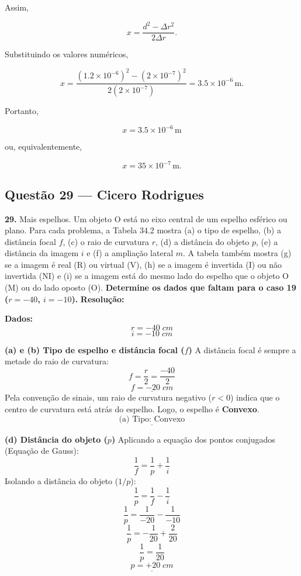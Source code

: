\documentclass[12pt,a4paper]{article}
\begin{document}
Assim,

\[
x=\frac{d^2-\Delta r^2}{2\Delta r}.
\]

Substituindo os valores numéricos,

\[
x=
\frac{(1.2\times10^{-6})^2-(2\times10^{-7})^2}
     {2(2\times10^{-7})}
=
3.5\times10^{-6}\,\text{m}.
\]

Portanto,

\[
\boxed{x=3.5\times10^{-6}\,\text{m}}
\]

ou, equivalentemente,

\[
\boxed{x=35\times10^{-7}\,\text{m}}.
\]

\subsection{Questão 29 — Cicero Rodrigues}

\textbf{29. }\normalfont Mais espelhos. Um objeto O está no eixo central de um espelho esférico ou plano. Para cada problema, a Tabela 34.2 mostra (a) o tipo de espelho, (b) a distância focal $f$, (c) o raio de curvatura $r$, (d) a distância do objeto $p$, (e) a distância da imagem $i$ e (f) a ampliação lateral $m$. A tabela também mostra (g) se a imagem é real (R) ou virtual (V), (h) se a imagem é invertida (I) ou não invertida (NI) e (i) se a imagem está do mesmo lado do espelho que o objeto O (M) ou do lado oposto (O). \textbf{Determine os dados que faltam para o caso 19 ($r = -40$, $i = -10$).}
\textbf{Resolução:}
\vspace{0.3cm}

\textbf{Dados:}
\[r = -40\;cm\]
\[i = -10\;cm\]

\vspace{0.2cm}
\textbf{(a) e (b) Tipo de espelho e distância focal (\(f\))}
A distância focal é sempre a metade do raio de curvatura:
\[f = \frac{r}{2} = \frac{-40}{2}\]
\[\underline{f = -20\;cm}\]
Pela convenção de sinais, um raio de curvatura negativo (\(r < 0\)) indica que o centro de curvatura está atrás do espelho. Logo, o espelho é \textbf{Convexo}.
\[\underline{\text{(a) Tipo: Convexo}}\]

\vspace{0.2cm}
\textbf{(d) Distância do objeto (\(p\))}
Aplicando a equação dos pontos conjugados (Equação de Gauss):
\[\frac{1}{f} = \frac{1}{p} + \frac{1}{i}\]
Isolando a distância do objeto (\(1/p\)):
\[\frac{1}{p} = \frac{1}{f} - \frac{1}{i}\]
\[\frac{1}{p} = \frac{1}{-20} - \frac{1}{-10}\]
\[\frac{1}{p} = -\frac{1}{20} + \frac{2}{20}\]
\[\frac{1}{p} = \frac{1}{20}\]
\[\underline{p = +20\;cm}\]
\end{document}
